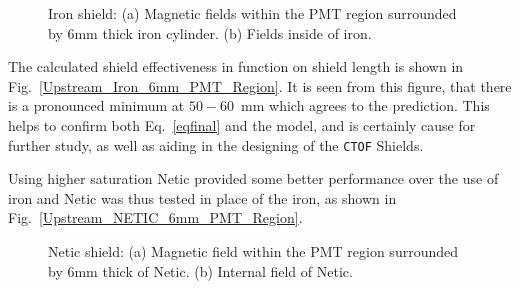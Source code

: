 \documentclass[12pt]{article}
\begin{document}
\begin{figure}[ht]
\centering
{}
\qquad
{}
\caption{\small{Iron shield: 
(a) Magnetic fields within the 
PMT region surrounded by 6mm thick iron cylinder. 
(b) Fields inside  of iron.}
\label{Upstream_SingleIron_6mm}}
\end{figure}
%
%
The calculated  shield  effectiveness  in function on shield length is shown in
Fig.~\ref{Upstream_Iron_6mm_PMT_Region}. It is seen from this figure,
that there is a pronounced minimum 
at $50-60$~mm which agrees   
to the prediction. This helps to confirm both Eq.~\ref{eqfinal} and the model, 
and is certainly cause for further study, as well as aiding in the 
designing of the {\tt CTOF} Shields. 

Using higher saturation Netic provided some  better  performance over the use of iron
and Netic was thus tested in place
of the iron, as shown in Fig.~\ref{Upstream_NETIC_6mm_PMT_Region}.
%
\begin{figure}[ht]
\centering
{}
\qquad
{}
\caption{\small{Netic  shield: (a) Magnetic field within the  PMT region
 surrounded by 6mm thick of Netic. (b) Internal  field of Netic.}}
\label{Upstream_SingleNETIC_6mm}
\end{figure}   
%
\end{document}
